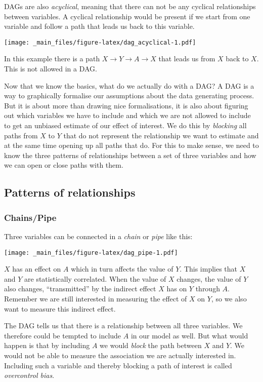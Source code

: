 \documentclass[
]{book}
\begin{document}
DAGs are also \emph{acyclical}, meaning that there can not be any cyclical
relationships between variables. A cyclical relationship would be present if we
start from one variable and follow a path that leads us back to this variable.

\texttt{[image: \_main\_files/figure-latex/dag\_acyclical-1.pdf]}

In this example there is a path \(X \rightarrow Y \rightarrow A \rightarrow X\)
that leads us from \(X\) back to \(X\). This is not allowed in a DAG.

Now that we know the basics, what do we actually do with a DAG? A DAG is a way
to graphically formalise our assumptions about the data generating process. But
it is about more than drawing nice formalisations, it is also about figuring out
which variables we have to include and which we are not allowed to include to
get an unbiased estimate of our effect of interest. We do this by \emph{blocking} all
paths from \(X\) to \(Y\) that do not represent the relationship we want to estimate
and at the same time opening up all paths that do. For this to make sense, we
need to know the three patterns of relationships between a set of three
variables and how we can open or close paths with them.

\hypertarget{patterns-of-relationships}{%
\subsection{Patterns of relationships}\label{patterns-of-relationships}}

\hypertarget{chainspipe}{%
\subsubsection{Chains/Pipe}\label{chainspipe}}

Three variables can be connected in a \emph{chain} or \emph{pipe} like this:

\texttt{[image: \_main\_files/figure-latex/dag\_pipe-1.pdf]}

\(X\) has an effect on \(A\) which in turn affects the value of \(Y\). This implies
that \(X\) and \(Y\) are statistically correlated. When the value of \(X\) changes,
the value of \(Y\) also changes, ``transmitted'' by the indirect effect \(X\) has
on \(Y\) through \(A\). Remember we are still interested in measuring the effect of \(X\) on
\(Y\), so we also want to measure this indirect effect.

The DAG tells us that there is a relationship between all three variables. We
therefore could be tempted to include \(A\) in our model as well. But what would
happen is that by including \(A\) we would \emph{block} the path between \(X\) and \(Y\).
We would not be able to measure the association we are actually interested in.
Including such a variable and thereby blocking a path of interest is called
\emph{overcontrol bias}.
\end{document}

